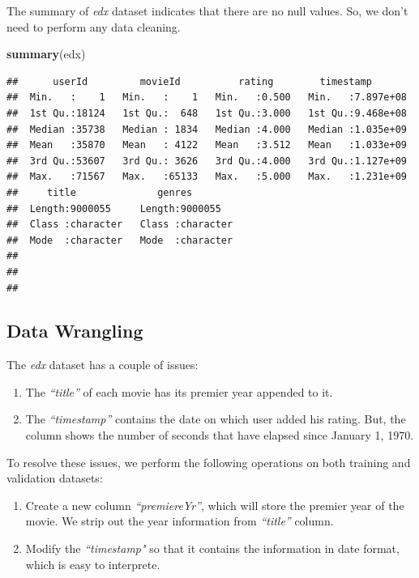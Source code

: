 \documentclass[]{article}
\newenvironment{Shaded}{\begin{snugshade}}{\end{snugshade}}
\newcommand{\KeywordTok}[1]{\textcolor[rgb]{0.13,0.29,0.53}{\textbf{#1}}}
\newcommand{\NormalTok}[1]{#1}
\begin{document}
The summary of \emph{edx} dataset indicates that there are no null
values. So, we don't need to perform any data cleaning.

\begin{Shaded}
\begin{Highlighting}[]
\KeywordTok{summary}\NormalTok{(edx)}
\end{Highlighting}
\end{Shaded}

\begin{verbatim}
##      userId         movieId          rating        timestamp        
##  Min.   :    1   Min.   :    1   Min.   :0.500   Min.   :7.897e+08  
##  1st Qu.:18124   1st Qu.:  648   1st Qu.:3.000   1st Qu.:9.468e+08  
##  Median :35738   Median : 1834   Median :4.000   Median :1.035e+09  
##  Mean   :35870   Mean   : 4122   Mean   :3.512   Mean   :1.033e+09  
##  3rd Qu.:53607   3rd Qu.: 3626   3rd Qu.:4.000   3rd Qu.:1.127e+09  
##  Max.   :71567   Max.   :65133   Max.   :5.000   Max.   :1.231e+09  
##     title              genres         
##  Length:9000055     Length:9000055    
##  Class :character   Class :character  
##  Mode  :character   Mode  :character  
##                                       
##                                       
## 
\end{verbatim}

\subsection{Data Wrangling}
\label{sec:dw}

The \emph{edx} dataset has a couple of issues:

\begin{enumerate}
\item The \emph{``title''} of each movie has its premier year appended to it.
\item The \emph{``timestamp''} contains the date on which user added his rating. But, the column shows the number of seconds that have elapsed since January 1, 1970.  
\end{enumerate}

To resolve these issues, we perform the following operations on both
training and validation datasets:

\begin{enumerate}
\item Create a new column \emph{``premiereYr''}, which will store the premier year of the movie. We strip out the year information from \emph{``title''} column.
\item Modify the \emph{``timestamp"} so that it contains the information in date format, which is easy to interprete. 
\end{enumerate}
\end{document}
